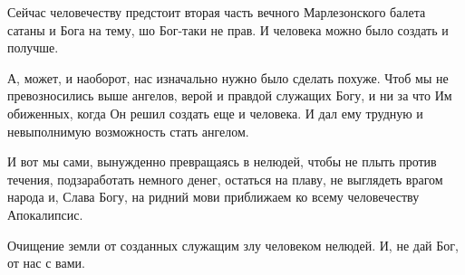 Сейчас человечеству предстоит вторая часть вечного Марлезонского балета сатаны
и Бога на тему, шо Бог-таки не прав. И человека можно было создать и получше.

А, может, и наоборот, нас изначально нужно было сделать похуже. Чтоб мы не
превозносились выше ангелов, верой и правдой служащих Богу, и ни за что Им
обиженных, когда Он решил создать еще и человека. И дал ему трудную и
невыполнимую возможность стать ангелом.

И вот мы сами, вынужденно превращаясь в нелюдей, чтобы не плыть против течения,
подзаработать немного денег, остаться на плаву, не выглядеть врагом народа и,
Слава Богу, на ридний мови приближаем ко всему человечеству Апокалипсис.

Очищение земли от созданных служащим злу человеком нелюдей. И, не дай Бог, от
нас с вами.


